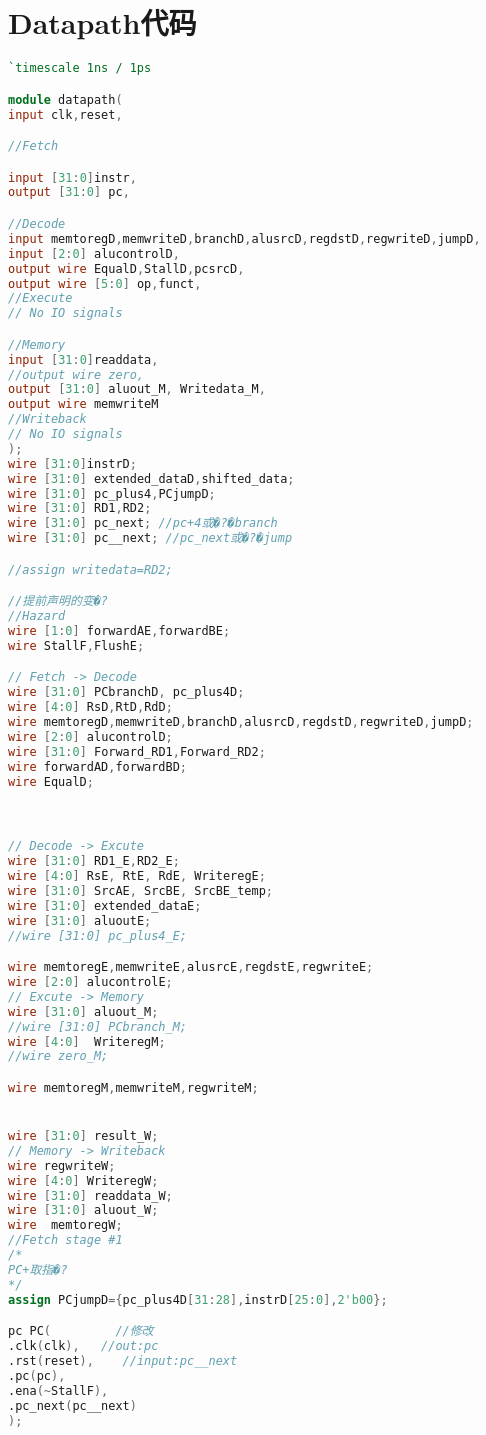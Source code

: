 \appendix
\section{Datapath代码}

\begin{lstlisting}[language=Verilog,frame=single]
`timescale 1ns / 1ps

module datapath(
input clk,reset,

//Fetch

input [31:0]instr,
output [31:0] pc,

//Decode
input memtoregD,memwriteD,branchD,alusrcD,regdstD,regwriteD,jumpD,
input [2:0] alucontrolD,
output wire EqualD,StallD,pcsrcD,
output wire [5:0] op,funct,
//Execute
// No IO signals

//Memory
input [31:0]readdata,
//output wire zero,
output [31:0] aluout_M, Writedata_M,
output wire memwriteM
//Writeback
// No IO signals
);
wire [31:0]instrD;
wire [31:0] extended_dataD,shifted_data;
wire [31:0] pc_plus4,PCjumpD;
wire [31:0] RD1,RD2;
wire [31:0] pc_next; //pc+4或�?�branch
wire [31:0] pc__next; //pc_next或�?�jump

//assign writedata=RD2;

//提前声明的变�?
//Hazard
wire [1:0] forwardAE,forwardBE;
wire StallF,FlushE;

// Fetch -> Decode
wire [31:0] PCbranchD, pc_plus4D;
wire [4:0] RsD,RtD,RdD;
wire memtoregD,memwriteD,branchD,alusrcD,regdstD,regwriteD,jumpD;
wire [2:0] alucontrolD;
wire [31:0] Forward_RD1,Forward_RD2;
wire forwardAD,forwardBD;
wire EqualD;



// Decode -> Excute
wire [31:0] RD1_E,RD2_E;
wire [4:0] RsE, RtE, RdE, WriteregE;
wire [31:0] SrcAE, SrcBE, SrcBE_temp;
wire [31:0] extended_dataE;
wire [31:0] aluoutE;
//wire [31:0] pc_plus4_E;

wire memtoregE,memwriteE,alusrcE,regdstE,regwriteE;
wire [2:0] alucontrolE;
// Excute -> Memory 
wire [31:0] aluout_M;
//wire [31:0] PCbranch_M;
wire [4:0]  WriteregM;
//wire zero_M;

wire memtoregM,memwriteM,regwriteM;


wire [31:0] result_W;
// Memory -> Writeback
wire regwriteW;
wire [4:0] WriteregW;
wire [31:0] readdata_W;
wire [31:0] aluout_W;
wire  memtoregW;
//Fetch stage #1
/*
PC+取指�?
*/
assign PCjumpD={pc_plus4D[31:28],instrD[25:0],2'b00};

pc PC(         //修改
.clk(clk),   //out:pc
.rst(reset),    //input:pc__next
.pc(pc),
.ena(~StallF),
.pc_next(pc__next)
);


\end{lstlisting}
